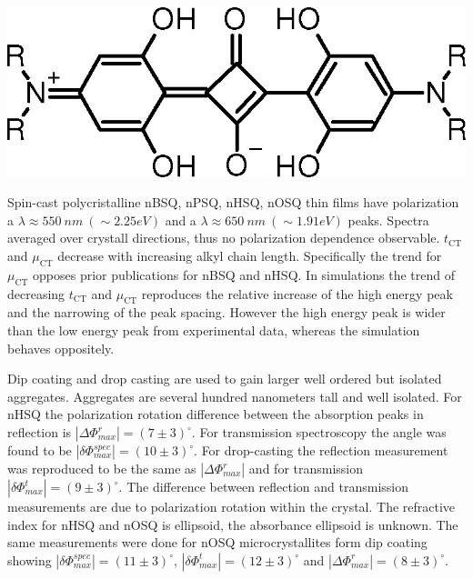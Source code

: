 \documentclass{article}
\newenvironment{Figure}
  {\par\medskip\noindent\minipage{\linewidth}}
  {\endminipage\par\medskip}
\begin{document}
\begin{multicols}{2}
\begin{Figure}
\centering
\includegraphics[width = \linewidth]{images/nAlinoSquaraine.jpeg}
\label{SQstructureBasic}
\end{Figure}

Spin-cast polycristalline nBSQ, nPSQ, nHSQ, nOSQ thin films have polarization a $\lambda \approx 550\: nm\: (\sim 2.25 eV)$ and a $\lambda \approx 650\: nm\: (\sim 1.91 eV)$ peaks. Spectra averaged over crystall directions, thus no polarization dependence observable. $t_\mathrm{CT}$ and $\mu_\mathrm{CT}$ decrease with increasing alkyl chain length. Specifically the trend for $\mu_\mathrm{CT}$ opposes prior publications for nBSQ and nHSQ. In simulations the trend of decreasing $t_\mathrm{CT}$ and $\mu_\mathrm{CT}$ reproduces the relative increase of the high energy peak and the narrowing of the peak spacing. However the high energy peak is wider than the low energy peak from experimental data, whereas the simulation behaves oppositely.\cite{Balzer2022}

Dip coating and drop casting are used to gain larger well ordered but isolated aggregates. Aggregates are several hundred nanometers tall and well isolated. For nHSQ the polarization rotation difference between the absorption peaks in reflection is $|\Delta\Phi^r_{max}| = (7\pm3)^\circ$. For transmission spectroscopy the angle was found to be $|\delta\Phi^{spec}_{max}| = (10 \pm 3)^\circ$. For drop-casting the reflection measurement was reproduced to be the same as $|\Delta\Phi^r_{max}|$ and for transmission $|\delta\Phi^{t}_{max}| = (9 \pm 3)^\circ$. The difference between reflection and transmission measurements are due to polarization rotation within the crystal. The refractive index for nHSQ and nOSQ is ellipsoid, the absorbance ellipsoid is unknown. The same measurements were done for nOSQ microcrystallites form dip coating showing $|\delta\Phi^{spec}_{max}| = (11\pm3)^\circ$, $|\delta\Phi^{t}_{max}| = (12\pm3)^\circ$ and $|\Delta\Phi^r_{max}| = (8\pm3)^\circ$.\cite{Balzer2022}


\end{multicols}
\end{document}
